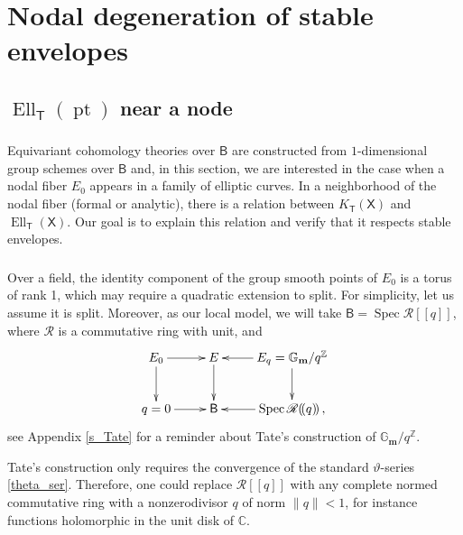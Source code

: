 \documentclass[14pt]{extarticle}
\newcommand{\C}{\mathbb{C}}
\newcommand{\Gm}{\mathbb{G}_\mathbf{m}}
\newcommand{\Z}{\mathbb{Z}}
\newcommand{\bT}{\mathsf{T}}
\newcommand{\bB}{\mathsf{B}}
\newcommand{\bX}{\mathsf{X}}
\newcommand{\cR}{\mathscr{R}}
\newcommand{\vth}{\vartheta}
\newcommand{\Fq}{(\!(q)\!)}
\DeclareMathOperator{\Ell}{Ell}
\DeclareMathOperator{\pt}{pt}
\DeclareMathOperator{\Spec}{Spec}
\theoremstyle{definition}
\begin{document}
\section{Nodal degeneration of stable envelopes}
\label{sec:stable-envel-tate}

\subsection{$\Ell_\bT(\pt)$ near a node}

\subsubsection{} 

Equivariant cohomology theories over $\bB$ are constructed from $1$-dimensional
group schemes over $\bB$ and, in this section, we are interested in
the case when a nodal fiber $E_0$ appears in a family of elliptic
curves. In a neighborhood of the nodal fiber (formal or analytic),
there is a relation between $K_\bT(\bX)$ and $\Ell_\bT(\bX)$. Our goal is to explain this relation
and verify that it 
respects stable envelopes.



\subsubsection{}

Over a field, the identity component of the group smooth points of
$E_0$ is a  torus of rank 1, which may require a quadratic extension to split.
For simplicity, let us assume it is split. Moreover, 
as our local model, we will take $\bB = \Spec \cR[[q]]$, where $\cR$ is
a commutative ring with unit, and 
%
\begin{equation}
\xymatrix{
  E_0  \ar[r] \ar[d] & E \ar[d] & E_q = \Gm / q^\Z  \ar[l] \ar[d]  \\
  q=0 \ar[r] & \bB &  \Spec \cR\Fq  \ar[l] \,, 
  }\label{local model} 
\end{equation}
%
see Appendix \ref{s_Tate} for a reminder about Tate's construction
of $\Gm / q^\Z$.

Tate's construction only requires
the convergence of the standard $\vth$-series \eqref{theta_ser}.  Therefore, one could replace
$\cR[[q]]$ with any complete normed commutative ring with a
nonzerodivisor
 $q$ of norm $\|
q\| < 1$, for instance functions holomorphic in the unit disk of
$\C$. 

\subsubsection{}
\end{document}
